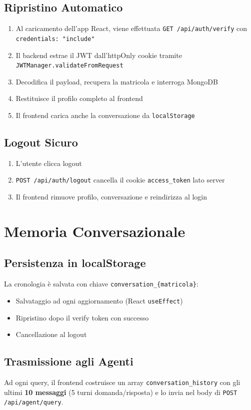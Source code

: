 \documentclass[a4paper,12pt]{report}
\begin{document}
\subsection{Ripristino Automatico}
\begin{enumerate}
    \item Al caricamento dell'app React, viene effettuata \texttt{GET /api/auth/verify} con \texttt{credentials: "include"}
    \item Il backend estrae il JWT dall'httpOnly cookie tramite \texttt{JWTManager.validateFromRequest}
    \item Decodifica il payload, recupera la matricola e interroga MongoDB
    \item Restituisce il profilo completo al frontend
    \item Il frontend carica anche la conversazione da \texttt{localStorage}
\end{enumerate}

\subsection{Logout Sicuro}
\begin{enumerate}
    \item L'utente clicca logout
    \item \texttt{POST /api/auth/logout} cancella il cookie \texttt{access\_token} lato server
    \item Il frontend rimuove profilo, conversazione e reindirizza al login
\end{enumerate}

\section{Memoria Conversazionale}

\subsection{Persistenza in localStorage}
La cronologia è salvata con chiave \texttt{conversation\_\{matricola\}}:
\begin{itemize}
    \item Salvataggio ad ogni aggiornamento (React \texttt{useEffect})
    \item Ripristino dopo il verify token con successo
    \item Cancellazione al logout
\end{itemize}

\subsection{Trasmissione agli Agenti}
Ad ogni query, il frontend costruisce un array \texttt{conversation\_history} con gli ultimi \textbf{10 messaggi} (5 turni domanda/risposta) e lo invia nel body di \texttt{POST /api/agent/query}.
\end{document}
